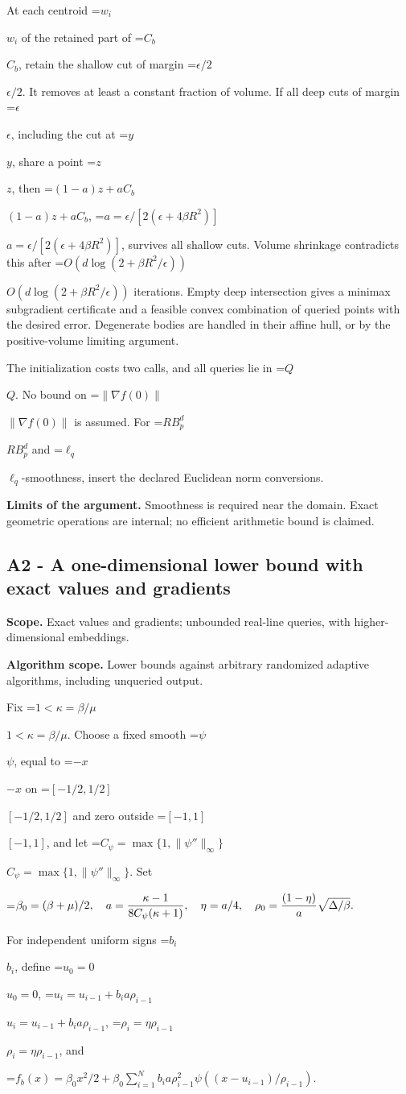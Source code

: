 \documentclass[10pt,a4paper]{article}
\newcommand{\AtlasMath}[1]{\par\begingroup\centering\setbox0=\hbox{$\displaystyle #1$}\ifdim\wd0>1.4\linewidth\typeout{ATLAS WIDE FORMULA: \the\wd0}\fi\ifdim\wd0>\linewidth\resizebox{\linewidth}{!}{\box0}\else\box0\fi\par\endgroup}
\newcommand{\AtlasInlineMath}[1]{\begingroup\setbox0=\hbox{$#1$}\ifdim\wd0>.4\linewidth\endgroup\AtlasMath{#1}\else\endgroup$#1$\fi}
\begin{document}
At each centroid \AtlasInlineMath{w_i} of the retained part of \AtlasInlineMath{C_b}, retain the shallow cut of margin \AtlasInlineMath{\epsilon/2}. It removes at least a constant fraction of volume. If all deep cuts of margin \AtlasInlineMath{\epsilon}, including the cut at \AtlasInlineMath{y}, share a point \AtlasInlineMath{z}, then
\AtlasInlineMath{(1-a)z+aC_b}, \AtlasInlineMath{a=\epsilon/[2(\epsilon+4\beta R^2)]}, survives all shallow cuts. Volume shrinkage contradicts this after \AtlasInlineMath{O(d\log(2+\beta R^2/\epsilon))} iterations. Empty deep intersection gives a minimax subgradient certificate and a feasible convex combination of queried points with the desired error. Degenerate bodies are handled in their affine hull, or by the positive-volume limiting argument.

The initialization costs two calls, and all queries lie in \AtlasInlineMath{Q}. No bound on \AtlasInlineMath{\|\nabla f(0)\|} is assumed. For \AtlasInlineMath{RB_p^d} and \AtlasInlineMath{\ell_q}-smoothness, insert the declared Euclidean norm conversions.

\textbf{Limits of the argument.} Smoothness is required near the domain. Exact geometric operations are internal; no efficient arithmetic bound is claimed.

\subsection{A2 - A one-dimensional lower bound with exact values and gradients}
\textbf{Scope.} Exact values and gradients; unbounded real-line queries, with higher-dimensional embeddings.

\textbf{Algorithm scope.} Lower bounds against arbitrary randomized adaptive algorithms, including unqueried output.

Fix \AtlasInlineMath{1<\kappa=\beta/\mu}. Choose a fixed smooth \AtlasInlineMath{\psi}, equal to \AtlasInlineMath{-x} on \AtlasInlineMath{[-1/2,1/2]} and zero outside \AtlasInlineMath{[-1,1]}, and let \AtlasInlineMath{C_\psi=\max\{1,\|\psi''\|_\infty\}}. Set

\AtlasMath{\beta_0=(\beta+\mu)/2,\quad a={\kappa-1\over8C_\psi(\kappa+1)},\quad
\eta=a/4,\quad \rho_0={(1-\eta)\over a}\sqrt{\Delta/\beta}.}

For independent uniform signs \AtlasInlineMath{b_i}, define \AtlasInlineMath{u_0=0},
\AtlasInlineMath{u_i=u_{i-1}+b_i a\rho_{i-1}}, \AtlasInlineMath{\rho_i=\eta\rho_{i-1}}, and

\AtlasMath{f_b(x)=\beta_0x^2/2+
\beta_0\sum_{i=1}^N b_i a\rho_{i-1}^2
\psi((x-u_{i-1})/\rho_{i-1}).}
\end{document}
